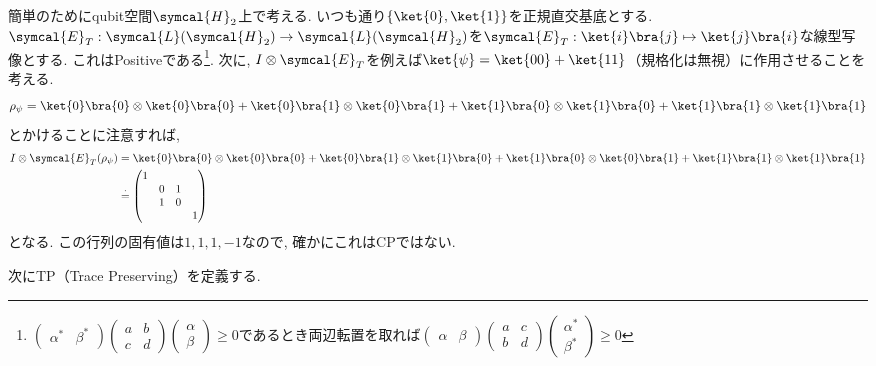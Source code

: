 \begin{e.g.}
  簡単のためにqubit空間$\symcal{H}_2$上で考える. 
  いつも通り$\{\ket{0}, \ket{1}\}$を正規直交基底とする. 
  $\symcal{E}_T:\symcal{L}(\symcal{H}_2)\to \symcal{L}(\symcal{H}_2)$を$\symcal{E}_T:\ket{i}\bra{j}\mapsto \ket{j}\bra{i}$な線型写像とする. 
  これはPositiveである\footnote{$\begin{pmatrix}\alpha^*&\beta^*\end{pmatrix}\begin{pmatrix}a&b\\c&d\end{pmatrix}\begin{pmatrix}\alpha\\ \beta\end{pmatrix}\geq 0$であるとき両辺転置を取れば$\begin{pmatrix}\alpha&\beta\end{pmatrix}\begin{pmatrix}a&c\\b&d\end{pmatrix}\begin{pmatrix}\alpha^*\\ \beta^*\end{pmatrix}\geq 0$}. 
  次に, $I\otimes \symcal{E}_T$を例えば$\ket{\psi}=\ket{00}+\ket{11}$（規格化は無視）に作用させることを考える. 
  \begin{equation}
    \rho_{\psi}=\ket{0}\bra{0}\otimes \ket{0}\bra{0}+\ket{0}\bra{1}\otimes \ket{0}\bra{1}+\ket{1}\bra{0}\otimes \ket{1}\bra{0}+\ket{1}\bra{1}\otimes \ket{1}\bra{1}
  \end{equation}
  とかけることに注意すれば, 
  \begin{align}
    I\otimes \symcal{E}_T(\rho_{\psi})&=\ket{0}\bra{0}\otimes \ket{0}\bra{0}+\ket{0}\bra{1}\otimes \ket{1}\bra{0}+\ket{1}\bra{0}\otimes \ket{0}\bra{1}+\ket{1}\bra{1}\otimes \ket{1}\bra{1}\\
    &\stackrel{\cdot}{=}\begin{pmatrix}
      1 & & & \\
       & 0&1& \\
       & 1&0& \\
       &  & &1 \\
    \end{pmatrix}
  \end{align}
  となる. 
  この行列の固有値は$1,1,1,-1$なので, 確かにこれはCPではない. \\
\end{e.g.}
次にTP（Trace Preserving）を定義する. 

